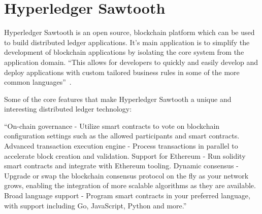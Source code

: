 \section{Hyperledger Sawtooth}

Hyperledger Sawtooth is an open source, blockchain platform which can
be used to build distributed ledger applications. It's main
application is to simplify the development of blockchain applications
by isolating the core system from the application domain. ``This
allows for developers to quickly and easily develop and deploy
applications with custom tailored business rules in some of the more
common languages''~\cite{hid-sp18-414-Hyperledger_Sawtooth}.

Some of the core features that make Hyperledger Sawtooth a unique and
interesting distributed ledger technology:
  
``On-chain governance - Utilize smart contracts to vote on blockchain
configuration settings such as the allowed participants and smart
contracts.  Advanced transaction execution engine - Process
transactions in parallel to accelerate block creation and validation.
Support for Ethereum - Run solidity smart contracts and integrate with
Ethereum tooling.  Dynamic consensus - Upgrade or swap the blockchain
consensus protocol on the fly as your network grows, enabling the
integration of more scalable algorithms as they are available.  Broad
language support - Program smart contracts in your preferred language,
with support including Go, JavaScript, Python and 
more.''~\cite{hid-sp18-414-Linux_Foundation_Sawtooth}
